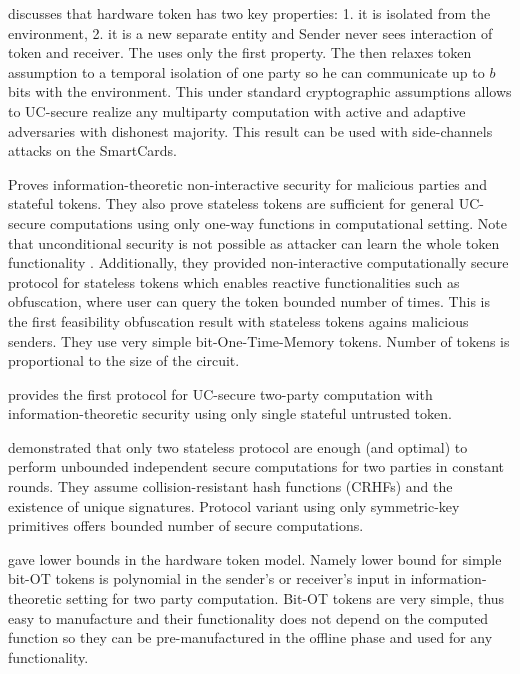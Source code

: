 \documentclass[
  digital, %
  twoside, %
  table,   %
  lof,     %
  lot,     %
]{fithesis3}
\begin{document}
\cite{DNW09} discusses that hardware token has two key properties: 1. it is isolated from the environment, 2. it is a new separate entity and Sender never sees interaction of token and receiver. The \cite{K07} uses only the first property. The \cite{DNW09} then relaxes token assumption to a temporal isolation of one party so he can communicate up to $b$ bits with the environment. This under standard cryptographic assumptions allows to UC-secure realize any multiparty computation with active and adaptive adversaries with dishonest majority. This result can be used with side-channels attacks on the SmartCards.

\cite{GISVW10} Proves information-theoretic non-interactive security for malicious parties and stateful tokens. They also prove stateless tokens are sufficient for general UC-secure  computations using only one-way functions in computational setting. Note that unconditional security is not possible as attacker can learn the whole token functionality \cite{GIMS10}. Additionally, they provided non-interactive computationally secure protocol for stateless tokens which enables reactive functionalities such as obfuscation, where user can query the token bounded number of times. This is the first feasibility obfuscation result with stateless tokens agains malicious senders. They use very simple bit-One-Time-Memory tokens. Number of tokens is proportional to the size of the circuit.

\cite{DKM11} provides the first protocol for UC-secure two-party computation with information-theoretic security using only single stateful untrusted token.

\cite{CKSYZ14} demonstrated that only two stateless protocol are enough (and optimal) to perform unbounded independent secure computations for two parties in constant rounds.
They assume collision-resistant hash functions (CRHFs) and the existence of unique signatures. Protocol variant using only symmetric-key primitives offers bounded number of secure computations.

\cite{AAGPR13} gave lower bounds in the hardware token model. Namely lower bound for simple bit-OT tokens is polynomial in the sender's or receiver's input in information-theoretic setting for two party computation. Bit-OT tokens are very simple, thus easy to manufacture and their functionality does not depend on the computed function so they can be pre-manufactured in the offline phase and used for any functionality.
\end{document}
